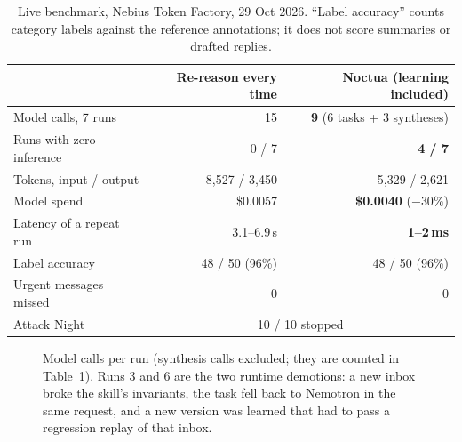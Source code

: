 \documentclass[11pt]{article}
\begin{document}
\begin{table}[!htbp]
\centering\small
\caption{Live benchmark, Nebius Token Factory, 29 Oct 2026. ``Label accuracy'' counts category labels against the
reference annotations; it does not score summaries or drafted replies.}
\label{tab:results}
\begin{tabular}{lrr}
\toprule
& Re-reason every time & Noctua (learning included)\\
\midrule
Model calls, 7 runs & 15 & \textbf{9} (6 tasks + 3 syntheses)\\
Runs with zero inference & 0 / 7 & \textbf{4 / 7}\\
Tokens, input / output & 8{,}527 / 3{,}450 & 5{,}329 / 2{,}621\\
Model spend & \$0.0057 & \textbf{\$0.0040} ($-30\%$)\\
Latency of a repeat run & 3.1--6.9\,s & \textbf{1--2\,ms}\\
Label accuracy & 48 / 50 (96\%) & 48 / 50 (96\%)\\
Urgent messages missed & 0 & 0\\
Attack Night & \multicolumn{2}{c}{10 / 10 stopped}\\
\bottomrule
\end{tabular}
\end{table}

\begin{figure}[!htbp]
\centering
{}
\caption{Model calls per run (synthesis calls excluded; they are counted in Table~\ref{tab:results}). Runs 3 and 6
are the two runtime demotions: a new inbox broke the skill's invariants, the task fell back to Nemotron in the same
request, and a new version was learned that had to pass a regression replay of that inbox.}
\label{fig:calls}
\end{figure}
\end{document}
